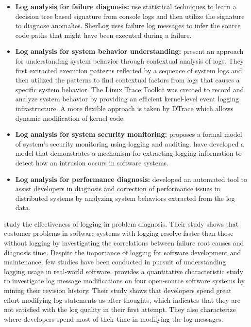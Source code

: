 \begin{itemize} [leftmargin=0.5in]
\item \textbf{Log analysis for failure diagnosis: }\citet{xu2009detecting} use statistical techniques to learn a decision tree based signature from console logs and then utilize the signature to diagnose anomalies. SherLog \cite{yuan2010sherlog} uses failure log messages to infer the source code paths that might have been executed during a failure.
\item \textbf{Log analysis for system behavior understanding: }\citet{fu2013contextual} present an approach for understanding system behavior through contextual analysis of logs. They first extracted execution patterns reflected by a sequence of system logs and then utilized the patterns to find contextual factors from logs that causes a specific system behavior. The Linux Trace Toolkit \cite{yaghmour2000measuringandcharacter} was created to record and analyze system behavior by providing an efficient kernel-level event logging infrastructure. A more flexible approach is taken by DTrace \cite{cantrill2004dynamic} which allows dynamic modification of kernel code.
\item \textbf{Log analysis for system security monitoring: }\citet{bishop1989model} proposes a formal model of system's security monitoring using logging and auditing. \citet{peisert2007toward} have developed a model that demonstrates a mechanism for extracting logging information to detect how an intrusion occurs in software systems.
\item \textbf{Log analysis for performance diagnosis: }\citet{nagaraj2012structured} developed an automated tool to assist developers in diagnosis and correction of performance issues in distributed systems by analyzing system behaviors extracted from the log data.
\end{itemize}

\citet{jiang2009understanding} study the effectiveness of logging in problem diagnosis. Their study shows that customer problems in software systems with logging resolve faster than those without logging by investigating the correlations between failure root causes and diagnosis time. Despite the importance of logging for software development and maintenance, few studies have been conducted in pursuit of understanding logging usage in real-world software. \citet{yuan2012characterizing} provides a quantitative characteristic study to investigate log message modifications on four open-source software systems by mining their revision history. Their study shows that developers spend great effort modifying log statements as after-thoughts, which indicates that they are not satisfied with the log quality in their first attempt. They also characterize where developers spend most of their time in modifying the log messages.

